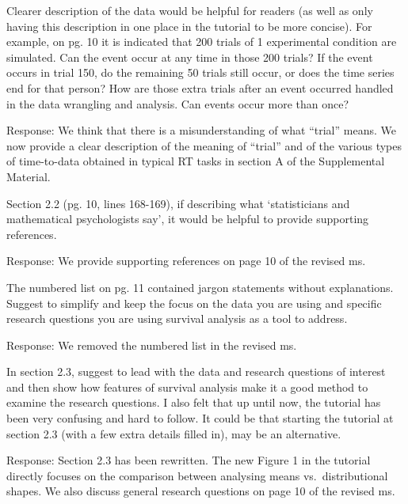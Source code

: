 \documentclass[
]{article}
\renewenvironment{quote}{\begin{leftbar}}{\end{leftbar}}
\begin{document}
\begin{quote}
Clearer description of the data would be helpful for readers (as well as
only having this description in one place in the tutorial to be more
concise). For example, on pg. 10 it is indicated that 200 trials of 1
experimental condition are simulated. Can the event occur at any time in
those 200 trials? If the event occurs in trial 150, do the remaining 50
trials still occur, or does the time series end for that person? How are
those extra trials after an event occurred handled in the data wrangling
and analysis. Can events occur more than once?
\end{quote}

Response: We think that there is a misunderstanding of what ``trial''
means. We now provide a clear description of the meaning of ``trial''
and of the various types of time-to-data obtained in typical RT tasks in
section A of the Supplemental Material.

\begin{quote}
Section 2.2 (pg. 10, lines 168-169), if describing what `statisticians
and mathematical psychologists say', it would be helpful to provide
supporting references.
\end{quote}

Response: We provide supporting references on page 10 of the revised ms.

\begin{quote}
The numbered list on pg. 11 contained jargon statements without
explanations. Suggest to simplify and keep the focus on the data you are
using and specific research questions you are using survival analysis as
a tool to address.
\end{quote}

Response: We removed the numbered list in the revised ms.

\begin{quote}
In section 2.3, suggest to lead with the data and research questions of
interest and then show how features of survival analysis make it a good
method to examine the research questions. I also felt that up until now,
the tutorial has been very confusing and hard to follow. It could be
that starting the tutorial at section 2.3 (with a few extra details
filled in), may be an alternative.
\end{quote}

Response: Section 2.3 has been rewritten. The new Figure 1 in the
tutorial directly focuses on the comparison between analysing means
vs.~distributional shapes. We also discuss general research questions on
page 10 of the revised ms.
\end{document}
